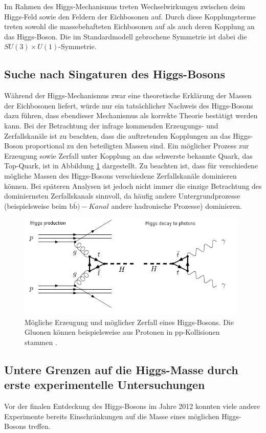 Im Rahmen des Higgs-Mechanismus treten Wechselwirkungen zwischen deim Higgs-Feld sowie den Feldern der Eichbosonen auf.
Durch diese Kopplungsterme treten sowohl die massebehafteten Eichbosonen auf als auch deren Kopplung an das Higgs-Boson.
Die im Standardmodell gebrochene Symmetrie ist dabei die $SU(3) \times U(1)$-Symmetrie.

\subsection{Suche nach Singaturen des Higgs-Bosons}
Während der Higgs-Mechanismus zwar eine theoretische Erklärung der Massen der Eichbosonen liefert, würde nur ein tatsächlicher Nachweis des Higgs-Bosons dazu führen, dass ebendieser Mechanismus als korrekte Theorie bestätigt werden kann.
Bei der Betrachtung der infrage kommenden Erzeugungs- und Zerfallskanäle ist zu beachten, dass die auftretenden Kopplungen an das Higgs-Boson proportional zu den beteiligten Massen sind.
Ein möglicher Prozess zur Erzeugung sowie Zerfall unter Kopplung an das schwerste bekannte Quark, das Top-Quark, ist in Abbildung \ref{fig:higgs2} dargestellt.
Zu beachten ist, dass für verschiedene mögliche Massen des Higgs-Bosons verschiedene Zerfallskanäle dominieren können.
Bei späteren Analysen ist jedoch nicht immer die einzige Betrachtung des dominiernsten Zerfallskanals sinnvoll, da häufig andere Untergrundprozesse (beispielsweise beim $\text{b}\overline{\text{b}})-Kanal$ andere hadronische Prozesse) dominieren.

\begin{figure}
  \centering
  \includegraphics[height=5.0cm]{ressources/higgsfeyn.png}
  \caption{Mögliche Erzeugung und möglicher Zerfall eines Higgs-Bosons. Die Gluonen können beispielsweise aus Protonen in pp-Kollisionen stammen \cite{higgs_production_decay}.}
  \label{fig:higgs2}
\end{figure}

\subsection{Untere Grenzen auf die Higgs-Masse durch erste experimentelle Untersuchungen}
Vor der finalen Entdeckung des Higgs-Bosons im Jahre 2012 konnten viele andere Experimente bereits Einschränkungen auf die Masse eines möglichen Higgs-Bosons treffen.

